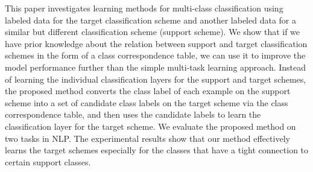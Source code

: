 This paper investigates learning methods for multi-class classification using labeled data for the target classification scheme and another labeled data for a similar but different classification scheme (support scheme). We show that if we have prior knowledge about the relation between support and target classification schemes in the form of a class correspondence table, we can use it to improve the model performance further than the simple multi-task learning approach. Instead of learning the individual classification layers for the support and target schemes, the proposed method converts the class label of each example on the support scheme into a set of candidate class labels on the target scheme via the class correspondence table, and then uses the candidate labels to learn the classification layer for the target scheme. We evaluate the proposed method on two tasks in NLP. The experimental results show that our method effectively learns the target schemes especially for the classes that have a tight connection to certain support classes.
